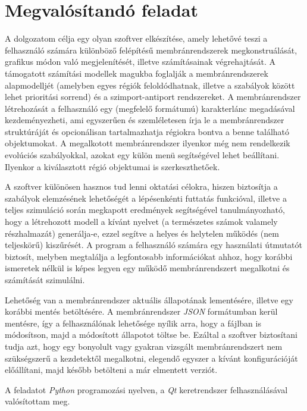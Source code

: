 \section{Megvalósítandó feladat}

A dolgozatom célja egy olyan szoftver elkészítése, amely lehetővé teszi a felhasználó számára különböző felépítésű membránrendszerek megkonstruálását, grafikus módon való megjelenítését, illetve számításainak végrehajtását. A támogatott számítási modellek magukba foglalják a membránrendszerek alapmodelljét (amelyben egyes régiók feloldódhatnak, illetve a szabályok között lehet prioritási sorrend) és a szimport-antiport rendszereket.
A membránrendszer létrehozását a felhasználó egy (megfelelő formátumú) karakterlánc megadásával kezdeményezheti, ami egyszerűen és szemléletesen írja le a membránrendszer struktúráját és opcionálisan tartalmazhatja régiokra bontva a benne található objektumokat. A megalkotott membránrendszer ilyenkor még nem rendelkezik evolúciós szabályokkal, azokat egy külön menü segítségével lehet beállítani. Ilyenkor a kiválasztott régió objektumai is szerkeszthetőek.

A szoftver különösen hasznos tud lenni oktatási célokra, hiszen biztosítja a szabályok elemzésének lehetőségét a lépésenkénti futtatás funkcióval, illetve a teljes szimuláció során megkapott eredmények segítségével tanulmányozható, hogy a létrehozott modell a kívánt nyelvet (a természetes számok valamely részhalmazát) generálja-e, ezzel segítve a helyes és helytelen működés (nem teljeskörű) kiszűrését.
A program a felhasználó számára egy használati útmutatót biztosít, melyben megtalálja a legfontosabb információkat ahhoz, hogy korábbi ismeretek nélkül is képes legyen egy működő membránrendszert megalkotni és számítását szimulálni.

Lehetőség van a membránrendszer aktuális állapotának lementésére, illetve egy korábbi mentés betöltésére. A membránrendszer \textit{JSON} formátumban kerül mentésre, így a felhasználónak lehetősége nyílik arra, hogy a fájlban is módosítson, majd a módosított állapotot töltse be. Ezáltal a szoftver biztosítani tudja azt, hogy egy bonyolult vagy gyakran vizsgált membránrendszert nem szükségszerű a kezdetektől megalkotni, elegendő egyszer a kívánt konfigurációját előállítani, majd később betölteni a már elmentett verziót.

A feladatot \textit{Python} programozási nyelven, a \textit{Qt} keretrendszer felhasználásával valósítottam meg.
